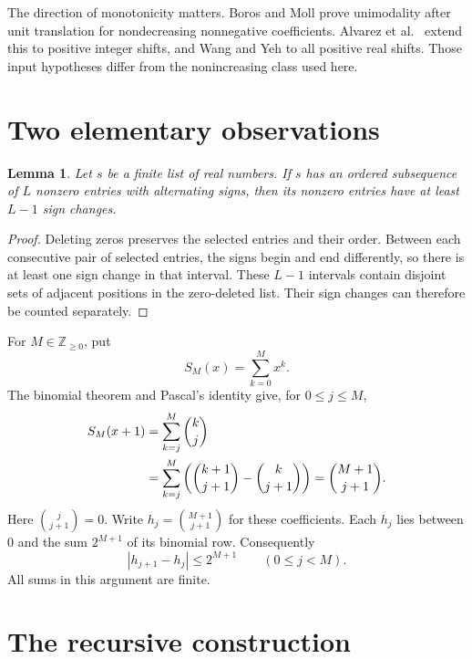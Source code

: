 \documentclass[11pt]{article}
\newtheorem{lemma}{Lemma}
\newcommand{\Z}{\mathbb Z}
\begin{document}
The direction of monotonicity matters. Boros and Moll \cite{BM} prove
unimodality after unit translation for nondecreasing nonnegative
coefficients. Alvarez et al.\ \cite{AA} extend this to positive integer
shifts, and Wang and Yeh \cite{WY} to all positive real shifts.
Those input hypotheses differ from the nonincreasing class used here.

\section{Two elementary observations}

\begin{lemma}\label{lem:signs}
Let $s$ be a finite list of real numbers. If $s$ has an ordered
subsequence of $L$ nonzero entries with alternating signs, then its
nonzero entries have at least $L-1$ sign changes.
\end{lemma}

\begin{proof}
Deleting zeros preserves the selected entries and their order.
Between each consecutive pair of selected entries, the signs begin
and end differently, so there is at least one sign change in that
interval. These $L-1$ intervals contain disjoint sets of adjacent
positions in the zero-deleted list. Their sign changes can therefore
be counted separately.
\end{proof}

For $M\in\Z_{\geq0}$, put
\begin{equation}\label{eq:SM}
 S_M(x)=\sum_{k=0}^{M}x^k.
\end{equation}
The binomial theorem and Pascal's identity give, for $0\leq j\leq M$,
\begin{align}
 [x^j]S_M(x+1)
 &=\sum_{k=j}^{M}\binom{k}{j}\notag\\
 &=\sum_{k=j}^{M}
   \left(\binom{k+1}{j+1}-\binom{k}{j+1}\right)
 =\binom{M+1}{j+1}.\label{eq:hockey}
\end{align}
Here $\binom{j}{j+1}=0$. Write
$h_j=\binom{M+1}{j+1}$ for these coefficients. Each $h_j$ lies
between $0$ and the sum $2^{M+1}$ of its binomial row. Consequently
\begin{equation}\label{eq:perturbation}
 |h_{j+1}-h_j|\leq2^{M+1}
 \qquad(0\leq j<M).
\end{equation}
All sums in this argument are finite.

\section{The recursive construction}
\end{document}
